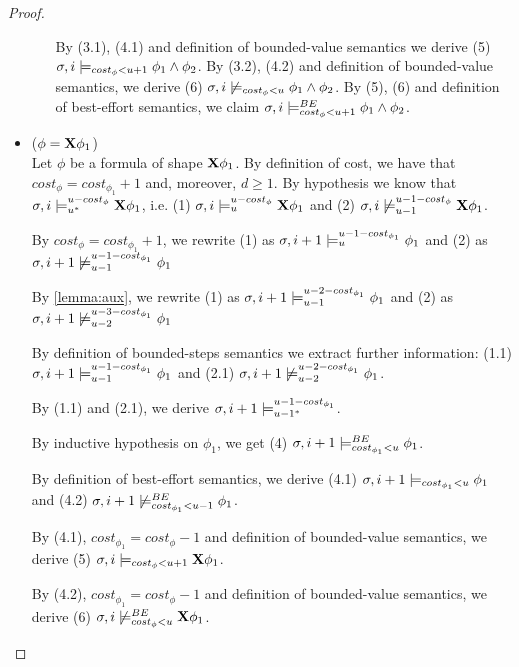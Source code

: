 \begin{theorem}
\begin{proof}
\begin{itemize}
\begin{itemize}
        By (3.1), (4.1) and definition of bounded-value semantics we derive (5) $\sigma,i \models_{cost_\phi < u + 1} \phi_1 \land \phi_2$.
        By (3.2), (4.2) and definition of bounded-value semantics, we derive (6) $\sigma,i \not\models_{cost_\phi < u} \phi_1 \land \phi_2$.
        By (5), (6) and definition of best-effort semantics, we claim $\sigma,i \models_{cost_\phi < u + 1}^{BE} \phi_1 \land \phi_2$.      
    
    \end{itemize}
    
    
    \item ($\phi = \mathbf{X} \phi_1$) \\
    Let $\phi$ be a formula of shape $\mathbf{X} \phi_1$.
    By definition of cost, we have that $cost_\phi = cost_{\phi_1} + 1$ and, moreover, $d \geq 1$.
    By hypothesis we know that $\sigma,i \models_{{u}^*}^{u-cost_\phi} \mathbf{X} \phi_1$, i.e.
    (1) $\sigma,i \models_{u}^{u-cost_\phi} \mathbf{X} \phi_1$ and
    (2) $\sigma,i \not\models_{u-1}^{u-1-cost_\phi} \mathbf{X} \phi_1$.

    By $cost_\phi = cost_{\phi_1} + 1$, we rewrite
    (1) as $\sigma, i+1 \models_{u}^{u-1-cost_{\phi_1}} \phi_1$ and 
    (2) as $\sigma, i+1 \not\models_{u-1}^{u-1-cost_{\phi_1}} \phi_1$

    By \autoref{lemma:aux}, we rewrite 
    (1) as $\sigma, i+1 \models_{u-1}^{u-2-cost_{\phi_1}} \phi_1$ and
    (2) as $\sigma, i+1 \not\models_{u-2}^{u-3-cost_{\phi_1}} \phi_1$
    
    By definition of bounded-steps semantics we extract further information: 
    (1.1) $\sigma, i+1 \models_{u-1}^{u-1-cost_{\phi_1}} \phi_1$ and
    (2.1) $\sigma, i+1 \not\models_{u-2}^{u-2-cost_{\phi_1}} \phi_1$.

    By (1.1) and (2.1), we derive $\sigma,i+1 \models_{{u-1}^*}^{u-1-cost_{\phi_1}}$.

    By inductive hypothesis on $\phi_1$, we get (4) $\sigma,i+1 \models_{cost_{\phi_1} < u}^{BE} \phi_1$.

    By definition of best-effort semantics, we derive (4.1) $\sigma,i+1 \models_{cost_{\phi_1} < u} \phi_1$ and (4.2) $\sigma,i+1 \not\models_{cost_{\phi_1} < u-1}^{BE} \phi_1$.

    By (4.1), $cost_{\phi_1} = cost_\phi - 1$ and definition of bounded-value semantics, we derive (5) $\sigma,i \models_{cost_\phi < u + 1} \mathbf{X} \phi_1$.

    By (4.2), $cost_{\phi_1} = cost_\phi - 1$ and definition of bounded-value semantics, we derive  (6) $\sigma,i \not\models_{cost_\phi < u}^{BE} \mathbf{X} \phi_1$.


\end{itemize}
\end{proof}
\end{theorem}
